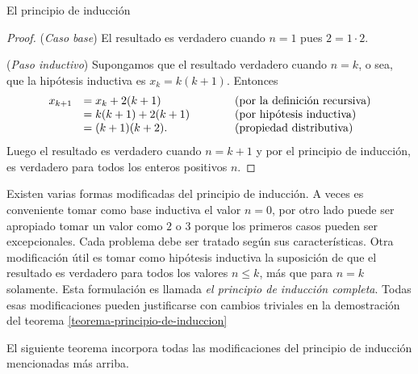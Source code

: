 \begin{section}{El principio de inducción}
\begin{proof}
\noindent(\textit{Caso  base}) El resultado es verdadero cuando $n=1$ pues $ 2 = 1 \cdot 2$.

\noindent (\textit{Paso  inductivo})
 Supongamos que el resultado verdadero cuando $n=k$, o sea, que la hipótesis inductiva es $x_k = k(k+1)$. Entonces
$$
\begin{matrix*}[l]
x_{k+1} &= x_k + 2(k+1) \hfill &\qquad &\text{(por la definición recursiva)} \hfill \\
&= k(k+1)+2(k+1) \hfill &\qquad &\text{(por hipótesis inductiva)}\hfill \\
&= (k+1)(k+2). \hfill  &\qquad &\text{(propiedad distributiva)}\hfill
\end{matrix*}
$$
Luego el resultado es verdadero cuando $n=k+1$ y por el principio de inducción, es verdadero para todos los enteros positivos $n$.
\end{proof}


Existen varias formas modificadas del principio de inducción. A veces es conveniente tomar como base inductiva el valor $n=0$, por otro lado puede ser apropiado tomar un valor como $2$ o $3$ porque los primeros casos pueden ser excepcionales. Cada problema debe ser tratado según sus características. Otra modificación útil es tomar como hipótesis inductiva la suposición de que el resultado es verdadero para todos los valores $n\le k$, más que para $n=k$ solamente. Esta formulación es llamada \textit{el principio de inducción completa}. Todas esas modificaciones pueden justificarse con cambios triviales en la demostración del teorema \ref{teorema-principio-de-induccion}

El siguiente teorema incorpora todas las modificaciones del principio de inducción mencionadas más arriba.


\end{section}
